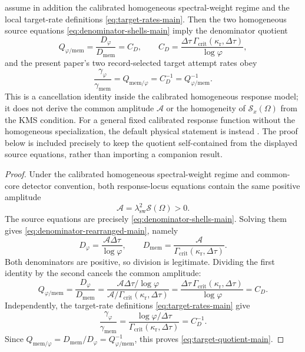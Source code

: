 \begin{corollary}\label{thm:ratio-main}
\ResponseStandingClause assume in addition the calibrated homogeneous
spectral-weight regime and the local target-rate definitions
\eqref{eq:target-rates-main}. Then the two homogeneous source equations
\eqref{eq:denominator-shells-main} imply the denominator quotient
\[
Q_{\varphi/\mathrm{mem}}
=
\frac{D_\varphi}{D_{\mathrm{mem}}}
=
C_D,
\qquad
C_D=\frac{\Delta\tau\,\Gamma_{\mathrm{crit}}(\kappa_{\mathrm r},\Delta\tau)}{\log\varphi},
\]
and the present paper's two record-selected target attempt rates obey
\begin{equation}\label{eq:target-quotient-main}
\frac{\gamma_\varphi}{\gamma_{\mathrm{mem}}}
=
Q_{\mathrm{mem}/\varphi}
=C_D^{-1}
=Q_{\varphi/\mathrm{mem}}^{-1}.
\end{equation}
This is a cancellation identity inside the calibrated homogeneous response
model; it does not derive the common amplitude $\mathcal A$ or the homogeneity of
$\mathcal S_x(\Omega)$ from the KMS condition. For a general fixed calibrated
response function without the homogeneous specialization, the default physical
statement is instead .
The proof below is included precisely to keep the quotient self-contained from
the displayed source equations, rather than importing a companion result.
\end{corollary}

\begin{proof}
Under the calibrated homogeneous spectral-weight regime and common-core
detector convention, both response-locus equations contain the same positive
amplitude
\[
\mathcal A=\lambda_{\mathrm{sw}}^2\mathcal S(\Omega)>0 .
\]
The source equations are precisely \eqref{eq:denominator-shells-main}. Solving
them gives \eqref{eq:denominator-rearranged-main}, namely
\[
D_\varphi=\frac{\mathcal A\Delta\tau}{\log\varphi},
\qquad
D_{\mathrm{mem}}
=\frac{\mathcal A}{\Gamma_{\mathrm{crit}}(\kappa_{\mathrm r},\Delta\tau)} .
\]
Both denominators are positive, so division is legitimate. Dividing the first
identity by the second cancels the common amplitude:
\[
Q_{\varphi/\mathrm{mem}}
=\frac{D_\varphi}{D_{\mathrm{mem}}}
=
\frac{\mathcal A\Delta\tau/\log\varphi}
     {\mathcal A/\Gamma_{\mathrm{crit}}(\kappa_{\mathrm r},\Delta\tau)}
=
\frac{\Delta\tau\,\Gamma_{\mathrm{crit}}(\kappa_{\mathrm r},\Delta\tau)}{\log\varphi}
=C_D .
\]
Independently, the target-rate definitions \eqref{eq:target-rates-main} give
\[
\frac{\gamma_\varphi}{\gamma_{\mathrm{mem}}}
=
\frac{\log\varphi/\Delta\tau}
     {\Gamma_{\mathrm{crit}}(\kappa_{\mathrm r},\Delta\tau)}
=C_D^{-1}.
\]
Since
$Q_{\mathrm{mem}/\varphi}=D_{\mathrm{mem}}/D_\varphi
=Q_{\varphi/\mathrm{mem}}^{-1}$, this proves
\eqref{eq:target-quotient-main}.
\end{proof}


